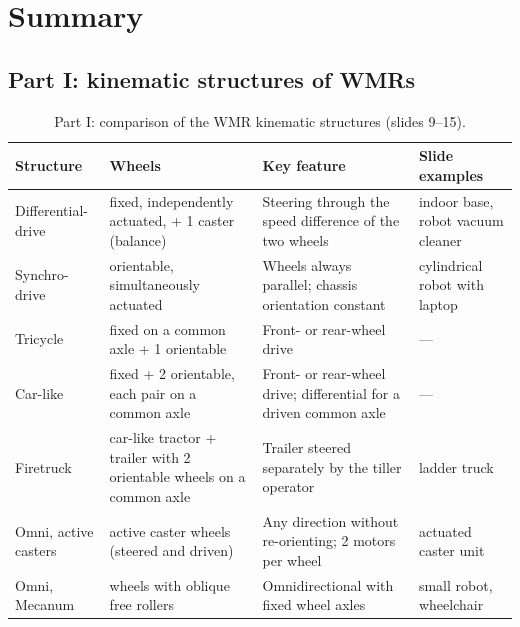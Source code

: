 \documentclass[11pt,a4paper]{article}
\theoremstyle{definition}
\theoremstyle{plain}
\theoremstyle{remark}
\begin{document}
\section{Summary}
 
\subsection{Part I: kinematic structures of WMRs}
 
\begin{table}[H]
\centering\footnotesize
\renewcommand{\arraystretch}{1.25}
\begin{tabular}{@{}>{\raggedright\arraybackslash}p{2.4cm}>{\raggedright\arraybackslash}p{3.9cm}>{\raggedright\arraybackslash}p{4.9cm}>{\raggedright\arraybackslash}p{2.5cm}@{}}
\toprule
Structure & Wheels & Key feature & Slide examples\\
\midrule
Differential-drive & 2 fixed, independently actuated, + 1 caster (balance) & Steering through the speed difference of the two wheels & indoor base, robot vacuum cleaner\\
Synchro-drive & 3 orientable, simultaneously actuated & Wheels always parallel; chassis orientation constant & cylindrical robot with laptop\\
Tricycle & 2 fixed on a common axle + 1 orientable & Front- or rear-wheel drive & ---\\
Car-like & 2 fixed + 2 orientable, each pair on a common axle & Front- or rear-wheel drive; differential for a driven common axle & ---\\
Firetruck & car-like tractor + trailer with 2 orientable wheels on a common axle & Trailer steered separately by the tiller operator & ladder truck\\
Omni, active casters & active caster wheels (steered and driven) & Any direction without re-orienting; 2 motors per wheel & actuated caster unit\\
Omni, Mecanum & wheels with oblique free rollers & Omnidirectional with fixed wheel axles & small robot, wheelchair\\
\bottomrule
\end{tabular}
\caption{Part I: comparison of the WMR kinematic structures (slides 9--15).}
\end{table}
 
\end{document}
